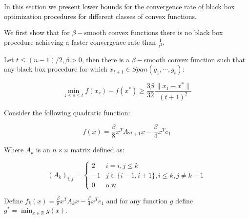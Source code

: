 In this section we present lower bounds for the convergence rate of black box optimization procedures for different classes of convex functions. 

We first show that for $\beta-$smooth convex functions there is no black box procedure achieving a faster convergence rate than $\frac{1}{t^2}$. 



\begin{theorem}
Let $t \leq (n-1)/2 , \beta >0$, then there is a $\beta-$smooth convex function such that any black box procedure for which $x_{t+1} \in Span(g_1, \cdots, g_t)$: 

\begin{equation}
\min_{1 \leq s \leq t } f(x_s ) - f(x^*) \geq \frac{3\beta}{32} \frac{\parallel x_1 - x^*\parallel}{(t+1)^2}
\end{equation}

\end{theorem}




\proofstart


Consider the following quadratic function:

\begin{equation}
    f(x) = \frac{\beta}{8}x^T A_{2t+1}x- \frac{\beta}{4}x^Te_1
\end{equation}


Where $A_k$ is an $n\times n$ matrix defined as:

\begin{equation}
(A_k)_{i,j} = \begin{cases}
                2  &  i = i,j \leq k \\
                -1 &  j \in \{i-1, i+1\}, i \leq k, j \neq k+1\\
                0 & \text{o.w.}
            \end{cases}
\end{equation}

 
Define $f_k(x) = \frac{\beta}{8} x^T A_k x - \frac{\beta}{4}x^Te_1$ and for any function $g$ define $g^* = \min_{x \in \mathbb{R}} g(x)$.

